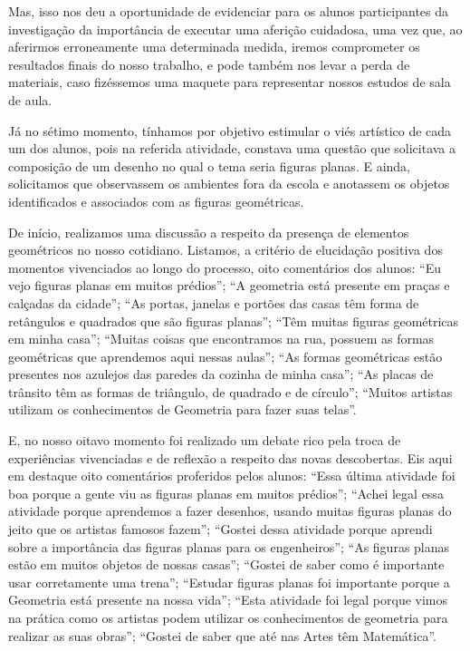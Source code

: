 \begin{refsection}
    Mas, isso nos deu a oportunidade de evidenciar para os alunos participantes da investigação da importância de executar uma aferição cuidadosa, uma vez que, ao aferirmos erroneamente uma determinada medida, iremos comprometer os resultados finais do nosso trabalho, e pode também nos levar a perda de materiais, caso fizéssemos uma maquete para representar nossos estudos de sala de aula. 

    Já no sétimo momento, tínhamos por objetivo estimular o viés artístico de cada um dos alunos, pois na referida atividade, constava uma questão que solicitava a composição de um desenho no qual o tema seria figuras planas. E ainda, solicitamos que observassem os ambientes fora da escola e anotassem os objetos identificados e associados com as figuras geométricas. 

    De início, realizamos uma discussão a respeito da presença de elementos geométricos no nosso cotidiano. Listamos, a critério de elucidação positiva dos momentos vivenciados ao longo do processo, oito comentários dos alunos: “Eu vejo figuras planas em muitos prédios”; “A geometria está presente em praças e calçadas da cidade”; “As portas, janelas e portões das casas têm forma de retângulos e quadrados que são figuras planas”; “Têm muitas figuras geométricas em minha casa”; “Muitas coisas que encontramos na rua, possuem as formas geométricas que aprendemos aqui nessas aulas”; “As formas geométricas estão presentes nos azulejos das paredes da cozinha de minha casa”; “As placas de trânsito têm as formas de triângulo, de quadrado e de círculo”; “Muitos artistas utilizam os conhecimentos de Geometria para fazer suas telas”. 

    E, no nosso oitavo momento foi realizado um debate rico pela troca de experiências vivenciadas e de reflexão a respeito das novas descobertas. Eis aqui em destaque oito comentários proferidos pelos alunos: “Essa última atividade foi boa porque a gente viu as figuras planas em muitos prédios”; “Achei legal essa atividade porque aprendemos a fazer desenhos, usando muitas figuras planas do jeito que os artistas famosos fazem”; “Gostei dessa atividade porque aprendi sobre a importância das figuras planas para os engenheiros”; “As figuras planas estão em muitos objetos de nossas casas”; “Gostei de saber como é importante usar corretamente uma trena”; “Estudar figuras planas foi importante porque a Geometria está presente na nossa vida”; “Esta atividade foi legal porque vimos na prática como os artistas podem utilizar os conhecimentos de geometria para realizar as suas obras”; “Gostei de saber que até nas Artes têm Matemática”.  


\end{refsection}
